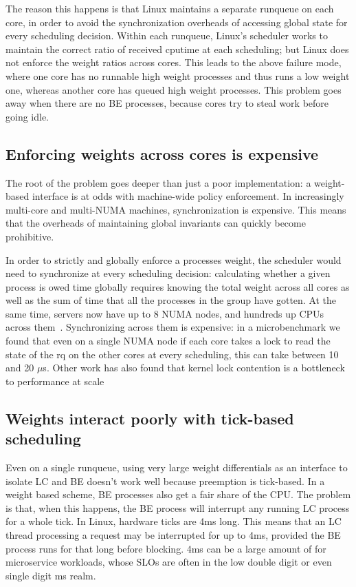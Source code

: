 The reason this happens is that Linux maintains a separate runqueue on each
core, in order to avoid the synchronization overheads of accessing global state
for every scheduling decision. Within each runqueue, Linux's scheduler works to maintain the
correct ratio of received cputime at each scheduling; but Linux does not enforce
the weight ratios across cores. This leads to the above failure mode, where one
core has no runnable high weight processes and thus runs a low weight one,
whereas another core has queued high weight processes. This problem goes away
when there are no BE processes, because cores try to steal work before going
idle.

\subsection{Enforcing weights across cores is expensive}\label{ss:cross-core-hard}

The root of the problem goes deeper than just a poor implementation: a
weight-based interface is at odds with machine-wide policy enforcement. In
increasingly multi-core and multi-NUMA machines, synchronization is expensive.
This means that the overheads of maintaining global invariants can quickly
become prohibitive.

In order to strictly and globally enforce a processes weight, the scheduler
would need to synchronize at every scheduling decision: calculating whether a
given process is owed time globally requires knowing the total weight across all
cores as well as the sum of time that all the processes in the group have
gotten. At the same time, servers now have up to 8 NUMA nodes, and hundreds up
CPUs across them~\cite{TODO}. Synchronizing across them is expensive: in a
microbenchmark we found that even on a single NUMA node if each core takes a
lock to read the state of the rq on the other cores at every scheduling, this
can take between 10 and 20 $\mu$s. Other work has also found that kernel lock
contention is a bottleneck to performance at scale~\cite{TODO}


\subsection{Weights interact poorly with tick-based scheduling}\label{ss:quantum}

Even on a single runqueue, using very large weight differentials as an interface
to isolate LC and BE doesn't work well because preemption is tick-based. In a
weight based scheme, BE processes also get a fair share of the CPU. The problem
is that, when this happens, the BE process will interrupt any running LC process
for a whole tick. In Linux, hardware ticks are 4ms long. This means that an LC
thread processing a request may be interrupted for up to 4ms, provided the BE
process runs for that long before blocking. 4ms can be a large amount of for
microservice workloads, whose SLOs are often in the low double digit or even
single digit ms realm.~\cite{TODO}



